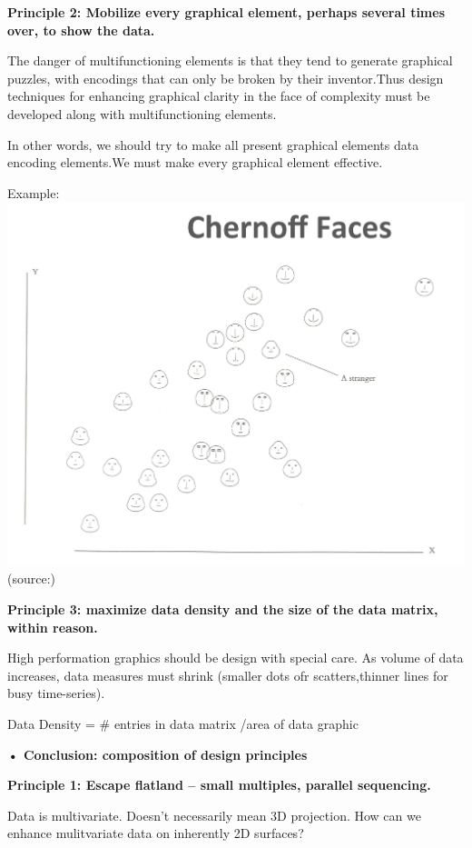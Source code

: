 \documentclass[]{book}
\theoremstyle{definition}
\theoremstyle{definition}
\theoremstyle{definition}
\theoremstyle{remark}
\begin{document}
\textbf{Principle 2: Mobilize every graphical element, perhaps several
times over, to show the data.}

The danger of multifunctioning elements is that they tend to generate
graphical puzzles, with encodings that can only be broken by their
inventor.Thus design techniques for enhancing graphical clarity in the
face of complexity must be developed along with multifunctioning
elements.

In other words, we should try to make all present graphical elements
data encoding elements.We must make every graphical element effective.

Example:\\
\includegraphics{images/Tufte_figure6.png} (source:\citep{Tufte_2001})

\textbf{Principle 3: maximize data density and the size of the data
matrix, within reason.}

High performation graphics should be design with special care. As volume
of data increases, data measures must shrink (smaller dots ofr
scatters,thinner lines for busy time-series). \citep{best-practice}

Data Density = \# entries in data matrix /area of data graphic

\textbf{• Conclusion: composition of design principles}

\textbf{Principle 1: Escape flatland -- small multiples, parallel
sequencing.}

Data is multivariate. Doesn't necessarily mean 3D projection. How can we
enhance mulitvariate data on inherently 2D surfaces?
\end{document}
